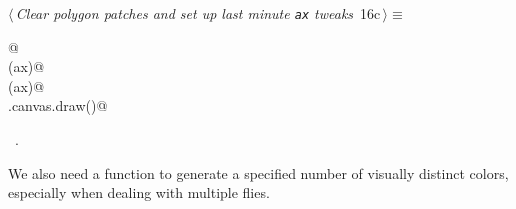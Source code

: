 \documentclass[11.5pt]{report}
\begin{document}
\begin{flushleft} \small
\begin{minipage}{\linewidth}\label{scrap10}\raggedright\small
{} $\langle\,${\itshape Clear polygon patches and set up last minute \verb|ax| tweaks}\nobreak\ {\footnotesize {16c}}$\,\rangle\equiv$
\vspace{-1ex}
\begin{list}{}{} \item
\mbox{}\verb@   @\\
\mbox{}\verb@clearAxPolygonPatches(ax)@\\
\mbox{}\verb@applyAxCorrection(ax)@\\
\mbox{}\verb@fig.canvas.draw()@\\
\mbox{}\verb@@{\NWsep}
\end{list}
\vspace{-1.5ex}
\footnotesize
\begin{list}{}{\setlength{\itemsep}{-\parsep}\setlength{\itemindent}{-\leftmargin}}
\item \NWtxtMacroRefIn\ .

\item{}
\end{list}
\end{minipage}\vspace{4ex}
\end{flushleft}



\newchunk  We also need a function to generate a specified number of visually distinct colors, especially
when dealing with  multiple flies. 
\end{document}
